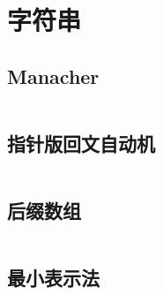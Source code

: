 \chapter{字符串}
\section{Manacher}
\inputminted{cpp}{\source/string/manacher.cpp}
\section{指针版回文自动机}
\inputminted{cpp}{\source/string/PalindromeAutomaton_pointer.cpp}
\section{后缀数组}
\inputminted{cpp}{\source/string/SA.cpp}
\section{最小表示法}
\inputminted{cpp}{\source/string/min_express.cpp}